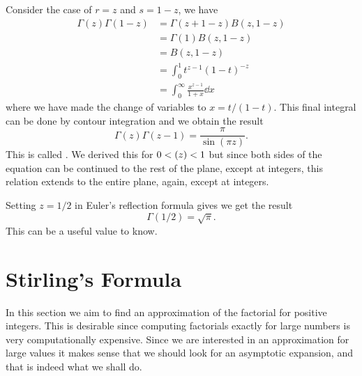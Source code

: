 \documentclass[fleqn]{NotesClass}
\let\Re\relax
\DeclareMathOperator{\Re}{Re}
\begin{document}
    Consider the case of \(r = z\) and \(s = 1 - z\), we have
    \begin{align}
        \Gamma(z)\Gamma(1 - z) &= \Gamma(z + 1 - z) B(z, 1 - z)\\
        &= \Gamma(1)B(z, 1 - z)\\
        &= B(z, 1 - z)\\
        &= \int_0^{1} t^{z-1}(1 - t)^{-z}\\
        &= \int_0^{\infty} \frac{x^{z-1}}{1 + x}\dd{x}
    \end{align}
    where we have made the change of variables to \(x = t/(1 - t)\).
    This final integral can be done by contour integration and we obtain the result
    \begin{equation}
        \Gamma(z)\Gamma(z-1) = \frac{\pi}{\sin(\pi z)}.
    \end{equation}
    This is called .
    We derived this for \(0 < \Re(z) < 1\) but since both sides of the equation can be continued to the rest of the plane, except at integers, this relation extends to the entire plane, again, except at integers.
    
    Setting \(z = 1/2\) in Euler's reflection formula gives we get the result
    \begin{equation}
        \Gamma(1/2) = \sqrt{\pi}.
    \end{equation}
    This can be a useful value to know.
    
    \section{Stirling's Formula}
    In this section we aim to find an approximation of the factorial for positive integers.
    This is desirable since computing factorials exactly for large numbers is very computationally expensive.
    Since we are interested in an approximation for large values it makes sense that we should look for an asymptotic expansion, and that is indeed what we shall do.
    
\end{document}
